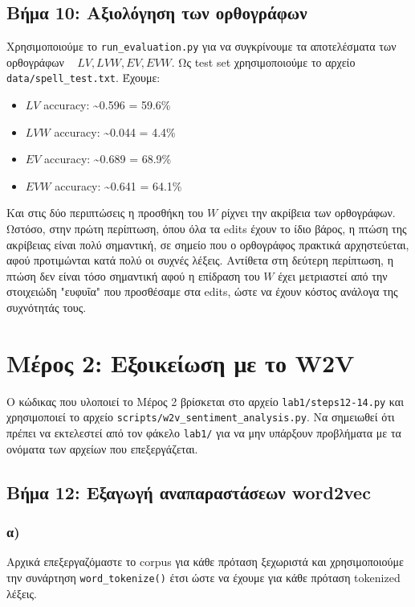 \documentclass[a4paper, 12pt]{article}
\begin{document}
    \subsection*{Βήμα 10: Αξιολόγηση των ορθογράφων}
    	Χρησιμοποιούμε το \verb|run_evaluation.py| για να συγκρίνουμε τα αποτελέσματα των ορθογράφων ~ $LV, LVW, EV, EVW$. Ως test set χρησιμοποιούμε το αρχείο \verb|data/spell_test.txt|. Έχουμε:
    	
    	\begin{itemize}
    		\item $LV$ accuracy: \textasciitilde0.596 = 59.6\%
    		\item $LVW$ accuracy: \textasciitilde0.044 = 4.4\%
    		\item $EV$ accuracy: \textasciitilde0.689 = 68.9\%
    		\item $EVW$ accuracy: \textasciitilde0.641 = 64.1\%
    	\end{itemize}
    	
    	Και στις δύο περιπτώσεις η προσθήκη του $W$ ρίχνει την ακρίβεια των ορθογράφων. Ωστόσο, στην πρώτη περίπτωση, όπου όλα τα edits έχουν το ίδιο βάρος, η πτώση της ακρίβειας είναι πολύ σημαντική, σε σημείο που ο ορθογράφος πρακτικά αρχηστεύεται, αφού προτιμώνται κατά πολύ οι συχνές λέξεις. Αντίθετα στη δεύτερη περίπτωση, η πτώση δεν είναι τόσο σημαντική αφού η επίδραση του $W$ έχει μετριαστεί από την στοιχειώδη "ευφυΐα" που προσθέσαμε στα edits, ώστε να έχουν κόστος ανάλογα της συχνότητάς τους.

\section*{Μέρος 2: Εξοικείωση με το W2V}
	Ο κώδικας που υλοποιεί το Μέρος 2 βρίσκεται στο αρχείο \verb|lab1/steps12-14.py| και χρησιμοποιεί το αρχείο \verb|scripts/w2v_sentiment_analysis.py|. Να σημειωθεί ότι πρέπει να εκτελεστεί από τον φάκελο \verb|lab1/| για να μην υπάρξουν προβλήματα με τα ονόματα των αρχείων που επεξεργάζεται.

    \subsection*{Βήμα 12: Εξαγωγή αναπαραστάσεων word2vec}
        \subsubsection*{α)}
        	Αρχικά επεξεργαζόμαστε  το corpus για κάθε πρόταση ξεχωριστά και χρησιμοποιούμε την συνάρτηση \verb|word_tokenize()| έτσι ώστε να έχουμε για κάθε πρόταση tokenized λέξεις.  
        	
\end{document}

